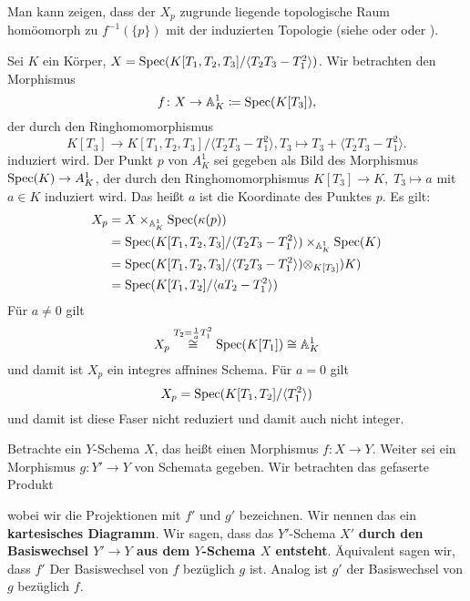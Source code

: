 \begin{bem}
\label{bem:8.7}
	Man kann zeigen, dass der $X_p$ zugrunde liegende topologische Raum homöomorph zu $f^{-1}(\{p\})$ mit der induzierten Topologie (siehe \cite[I.3.4.6]{grothendieck1971elements} oder \cite[Ex.II.3.10]{hartshorne1977algebraic} oder \cite[Prop. 4.20 und (4.8)]{goertz2010algebraic}).
\end{bem}

\begin{bsp}
\label{bsp:8.8}
	Sei $K$ ein Körper, $X=\operatorname{Spec}(K[T_1,T_2,T_3]/\langle T_2T_3 - T_1^2 \rangle)$. Wir betrachten den Morphismus
	\[
		f \colon X \to \mathbb {A}^1_K \coloneqq \operatorname{Spec}(K[T_3]),
	\]
	der durch den Ringhomomorphismus
	\[
		K[T_3] \to K[T_1,T_2,T_3]/\langle T_2T_3 - T_1^2 \rangle, T_3 \mapsto T_3 + \langle T_2T_3 - T_1^2 \rangle.
	\]
	induziert wird. Der Punkt $p$ von $A^1_K$ sei gegeben als Bild des Morphismus $\operatorname{Spec}(K) \to A^1_K$, der durch den Ringhomomorphismus $K[T_3]\to K,\; T_3 \mapsto a$ mit $a \in K$ induziert wird. Das heißt $a$ ist die Koordinate des Punktes $p$. Es gilt:
	\begin{align*}
		X_p &= X \times_{\mathbb {A}^1_K}\operatorname{Spec}(\kappa(p))\\
		&= \operatorname{Spec}(K[T_1,T_2,T_3]/\langle T_2T_3 - T_1^2 \rangle) \times_{\mathbb {A}^1_K}\operatorname{Spec}(K)\\
		&= \operatorname{Spec}(K[T_1,T_2,T_3]/\langle T_2T_3 - T_1^2 \rangle) \otimes_{K[T_3]}) K)\\
		&= \operatorname{Spec}(K[T_1,T_2]/\langle aT_2-T_1^2 \rangle)
	\end{align*}
	Für $a\neq 0$ gilt
	\[
		X_p \overset{T_2= \frac{1}{a}T_1^2}{\cong} \operatorname{Spec}(K[T_1]) \cong \mathbb {A}^1_K
	\]
	und damit ist $X_p$ ein integres affnines Schema. Für $a = 0$ gilt
	\[
		X_p = \operatorname{Spec}(K[T_1,T_2]/ \langle T_1^2 \rangle)
	\]
	und damit ist diese Faser nicht reduziert und damit auch nicht integer.
\end{bsp}

\begin{defn}[Basiswechsel]
\label{defn:8.9}
	Betrachte ein $Y$-Schema $X$, das heißt einen Morphismus $f\colon X \to Y$. Weiter sei ein Morphismus $g\colon Y' \to Y$ von Schemata gegeben. Wir betrachten das gefaserte Produkt
	\begin{center}
	\end{center}
	wobei wir die Projektionen mit $f'$ und $g'$ bezeichnen. Wir nennen das ein \textbf{kartesisches Diagramm}. Wir sagen, dass das $Y'$-Schema $X'$ \textbf{durch den Basiswechsel $Y'\to Y$ aus dem $Y$-Schema $X$ entsteht}. Äquivalent sagen wir, dass $f'$ Der Basiswechsel von $f$ bezüglich $g$ ist. Analog ist $g'$ der Basiswechsel von $g$ bezüglich $f$.
\end{defn}

